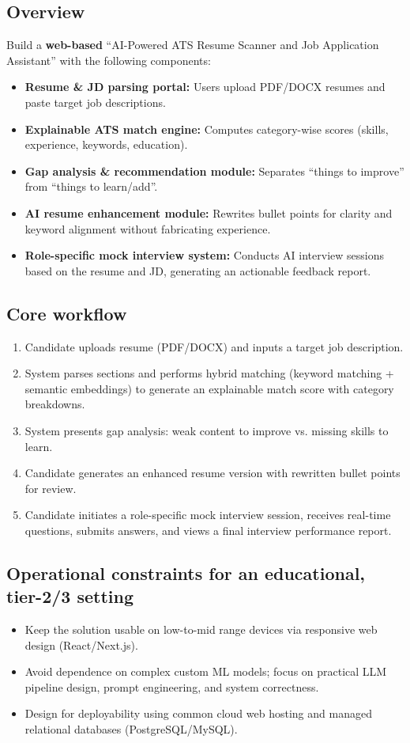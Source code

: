 \documentclass[11pt,a4paper]{article}
\begin{document}
\subsection{Overview}
Build a \textbf{web-based} ``AI-Powered ATS Resume Scanner
and Job Application Assistant'' with the following
components:
\begin{itemize}[leftmargin=0.7cm]
    \item \textbf{Resume \& JD parsing portal:} Users upload PDF/DOCX resumes and paste target job descriptions.
    \item \textbf{Explainable ATS match engine:} Computes category-wise scores (skills, experience, keywords, education).
    \item \textbf{Gap analysis \& recommendation module:} Separates ``things to improve'' from ``things to learn/add''.
    \item \textbf{AI resume enhancement module:} Rewrites bullet points for clarity and keyword alignment without fabricating experience.
    \item \textbf{Role-specific mock interview system:} Conducts AI interview sessions based on the resume and JD, generating an actionable feedback report.
\end{itemize}

\subsection{Core workflow}
\begin{enumerate}[leftmargin=0.7cm]
    \item Candidate uploads resume (PDF/DOCX) and inputs a target job description.
    \item System parses sections and performs hybrid matching (keyword matching + semantic embeddings) to generate an explainable match score with category breakdowns.
    \item System presents gap analysis: weak content to improve vs. missing skills to learn.
    \item Candidate generates an enhanced resume version with rewritten bullet points for review.
    \item Candidate initiates a role-specific mock interview session, receives real-time questions, submits answers, and views a final interview performance report.
\end{enumerate}

\subsection{Operational constraints for an educational, tier-2/3 setting}
\begin{itemize}[leftmargin=0.7cm]
    \item Keep the solution usable on low-to-mid range devices via responsive web design (React/Next.js).
    \item Avoid dependence on complex custom ML models; focus on practical LLM pipeline design, prompt engineering, and system correctness.
    \item Design for deployability using common cloud web hosting and managed relational databases (PostgreSQL/MySQL).
\end{itemize}
\end{document}
